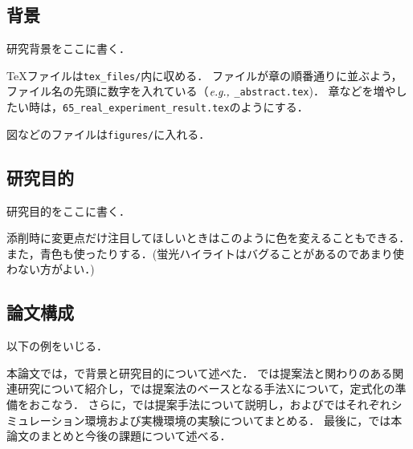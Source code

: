 \subsection{背景}
研究背景をここに書く．

\vspace{10truemm}
\TeX ファイルは\texttt{tex\_files/}内に収める．
ファイルが章の順番通りに並ぶよう，ファイル名の先頭に数字を入れている（$\textit{e.g.,}~$\texttt{{\_}abstract.tex})．
章などを増やしたい時は，\texttt{65\_real\_experiment\_result.tex}のようにする．

図などのファイルは\texttt{figures/}に入れる．

\subsection{研究目的}
研究目的をここに書く．

\vspace{10truemm}
添削時に変更点だけ注目してほしいときは{\red このように色を変えることもできる．}
また，{\blue 青色}も使ったりする．(蛍光ハイライトはバグることがあるのであまり使わない方がよい．)

\subsection{論文構成}
以下の例をいじる．\vspace{10truemm}


本論文では，で背景と研究目的について述べた．
では提案法と関わりのある関連研究について紹介し，では提案法のベースとなる手法Xについて，定式化の準備をおこなう．
さらに，では提案手法について説明し，およびではそれぞれシミュレーション環境および実機環境の実験についてまとめる．
最後に，では本論文のまとめと今後の課題について述べる．